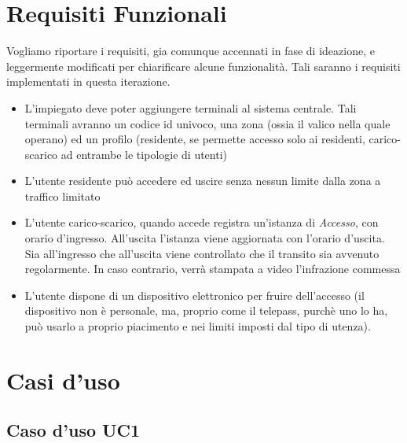 \documentclass[12pt, letterpaper]{article}
\begin{document}
\section{Requisiti Funzionali}
Vogliamo riportare i requisiti, gia comunque
accennati in fase di ideazione, e leggermente
modificati per chiarificare alcune funzionalità.
Tali saranno i requisiti implementati in 
questa iterazione.
\begin{itemize}
    \item L'impiegato deve poter aggiungere terminali al
    sistema centrale. Tali terminali avranno un codice 
    id univoco, una zona (ossia il valico nella quale 
    operano) ed un profilo (residente, se permette 
    accesso solo ai residenti, carico-scarico ad entrambe
    le tipologie di utenti)
    \item L'utente residente può accedere ed uscire senza 
    nessun limite dalla zona a traffico limitato
    \item L'utente carico-scarico, quando accede 
    registra un'istanza di \emph{Accesso}, con orario d'ingresso. 
    All'uscita l'istanza viene aggiornata con l'orario d'uscita. 
    Sia all'ingresso che all'uscita viene controllato che 
    il transito sia avvenuto regolarmente. In caso contrario, 
    verrà stampata a video l'infrazione commessa
    \item L'utente dispone di un dispositivo elettronico
    per fruire dell'accesso (il dispositivo non è personale,
    ma, proprio come il telepass, purchè uno lo ha, può usarlo
    a proprio piacimento e nei limiti imposti dal tipo di 
    utenza).
\end{itemize}

\section{Casi d'uso}

\subsection{Caso d'uso UC1}
\end{document}

